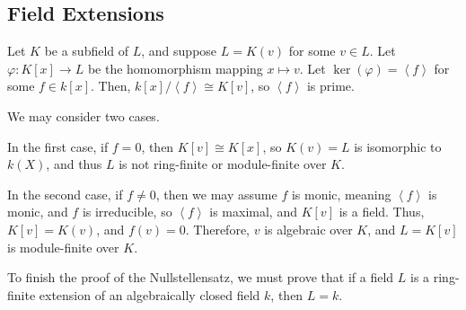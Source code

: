 \documentclass[10pt]{mypackage}
\begin{document}
\subsection{Field Extensions}%
Let $K$ be a subfield of $L$, and suppose $L = K(v)$ for some $v\in L$. Let $\varphi\colon K\left[ x \right]\rightarrow L$ be the homomorphism mapping $x\mapsto v$. Let $\ker\left( \varphi \right) = \left\langle f \right\rangle$ for some $f\in k\left[ x \right]$. Then, $k\left[ x \right]/\left\langle f \right\rangle\cong K\left[ v \right]$, so $\left\langle f \right\rangle$ is prime.\newline

We may consider two cases.\newline

In the first case, if $f = 0$, then $K\left[ v \right]\cong K\left[ x \right]$, so $K\left( v \right) = L$ is isomorphic to $k\left( X \right)$, and thus $L$ is not ring-finite or module-finite over $K$.\newline

In the second case, if $f\neq 0$, then we may assume $f$ is monic, meaning $\left\langle f \right\rangle$ is monic, and $f$ is irreducible, so $\left\langle f \right\rangle$ is maximal, and $K\left[ v \right]$ is a field. Thus, $K\left[ v \right] = K\left( v \right)$, and $f\left( v \right) = 0$. Therefore, $v$ is algebraic over $K$, and $L=K\left[ v \right]$ is module-finite over $K$.\newline

To finish the proof of the Nullstellensatz, we must prove that if a field $L$ is a ring-finite extension of an algebraically closed field $k$, then $L = k$.\newline
\end{document}
